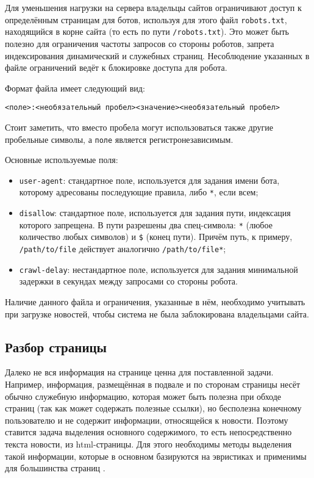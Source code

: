 Для уменьшения нагрузки на сервера владельцы сайтов ограничивают доступ к определённым страницам для ботов, используя для этого файл \verb|robots.txt|, находящийся в корне сайта (то есть по пути \verb|/robots.txt|). Это может быть полезно для ограничения частоты запросов со стороны роботов, запрета индексирования динамический и служебных страниц. Несоблюдение указанных в файле ограничений ведёт к блокировке доступа для робота.

Формат файла имеет следующий вид:
\begin{verbatim}
<поле>:<необязательный пробел><значение><необязательный пробел>
\end{verbatim}

Стоит заметить, что вместо пробела могут использоваться также другие пробельные символы, а \verb|поле| является регистронезависимым.

Основные используемые поля:
\begin{itemize}
    \item \verb|user-agent|: стандартное поле, используется для задания имени бота, которому адресованы последующие правила, либо \verb|*|, если всем;
    \item \verb|disallow|: стандартное поле, используется для задания пути, индексация которого запрещена. В пути разрешены два спец-символа: \verb|*| (любое количество любых символов) и \verb|$| (конец пути). Причём путь, к примеру, \verb|/path/to/file| действует аналогично \verb|/path/to/file*|;
    \item \verb|crawl-delay|: нестандартное поле, используется для задания минимальной задержки в секундах между запросами со стороны робота.
\end{itemize}

Наличие данного файла и ограничения, указанные в нём, необходимо учитывать при загрузке новостей, чтобы система не была заблокирована владельцами сайта.

\subsection{Разбор страницы}
Далеко не вся информация на странице ценна для поставленной задачи. Например, информация, размещённая в подвале и по сторонам страницы несёт обычно служебную информацию, которая может быть полезна при обходе страниц (так как может содержать полезные ссылки), но бесполезна конечному пользователю и не содержит информации, относящейся к новости. Поэтому ставится задача выделения основного содержимого, то есть непосредственно текста новости, из html-страницы. Для этого необходимы методы выделения такой информации, которые в основном базируются на эвристиках и применимы для большинства страниц \cite{pomikalek11}.

